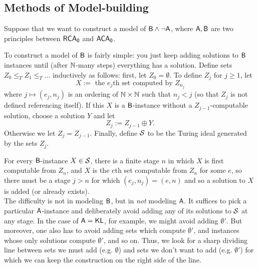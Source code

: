 \documentclass{amsart}
\begin{document}
	
	\subsection{Methods of Model-building}
	
	Suppose that we want to construct a model of $\sf{B}\^\neg \sf{A}$, where $\sf{A},\sf{B}$ are two principles between $\RCA$ and $\ACA$. 
	
	
	To construct a model of $\sf{B}$ is fairly simple: you just keep adding solutions to $\sf{B}$ instances until (after $\N$-many steps) everything has a solution. Define sets $Z_0\leq_T Z_1 \leq_T \dots$ inductively as follows: first, let $Z_0=\emptyset$. To define $Z_j$ for $j\geq 1$, let 
	$$X := \text{ the $e_j$th set computed by $Z_{n_j}$}$$
	where $j\mapsto (e_j,n_j)$ is an ordering of $\N\times \N$ such that $n_j<j$ (so that $Z_j$ is not defined referencing itself). If this $X$ is a $\sf{B}$-instance without a $Z_{j-1}$-computable solution, choose a solution $Y$ and let
	$$
	Z_j := Z_{j-1} \oplus Y.
	$$
	Otherwise we let $Z_j=Z_{j-1}$. Finally, define $\SS$ to be the Turing ideal generated by the sets $Z_j$.
	
	For every $\sf{B}$-instance $X\in \SS$, there is a finite stage $n$ in which $X$ is first computable from $Z_n$, and $X$ is the $e$th set computable from $Z_n$ for some $e$, so there must be a stage $j>n$ for which $(e_j,n_j)=(e,n)$ and so a solution to $X$ is added (or already exists). \\
	
	The difficulty is not in modeling $\sf{B}$, but in \textit{not} modeling $\sf{A}$. It suffices to pick a particular $\sf{A}$-instance and deliberately avoid adding any of its solutions to $\SS$ at any stage. In the case of $\sf{A}=\KL$, for example, we might avoid adding $\emptyset'$. But moreover, one also has to avoid adding sets which compute $\emptyset'$, and instances whose only solutions compute $\emptyset'$, and so on. Thus, we look for a sharp dividing line between sets we must add (e.g. $\emptyset$) and sets we don't want to add (e.g. $\emptyset'$) for which we can keep the construction on the right side of the line.\\
	
\end{document}
